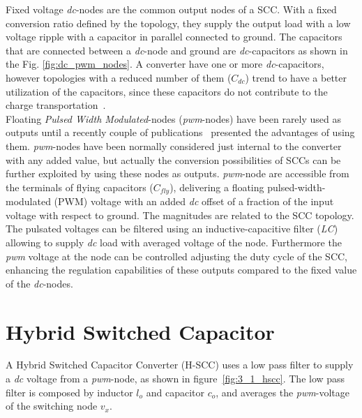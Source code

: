 Fixed voltage \emph{dc}-nodes are the common output nodes of a SCC. With a fixed conversion ratio defined by the topology, they supply the output load with a low voltage ripple with a capacitor in parallel connected to ground. The capacitors that are connected between a \emph{dc}-node and ground are  \emph{dc}-capacitors as shown in the Fig. \ref{fig:dc_pwm_nodes}. A converter have one or more \emph{dc}-capacitors, however topologies with a reduced number of them ($C_{dc}$) trend to have a better utilization of the capacitors, since these capacitors do not contribute to the charge transportation~\cite{Seeman:EECS-2009-78}.\\

Floating \emph{Pulsed Width Modulated}-nodes (\emph{pwm}-nodes) have been rarely used as outputs until a recently  couple of publications~\cite{2012Kumar, 2012Kline} presented the advantages of using them. \emph{pwm}-nodes have been normally considered just internal to the converter with any added value, but actually the conversion possibilities of SCCs can be further exploited by using these nodes as outputs.
\emph{pwm}-node are accessible from the terminals of flying capacitors ($C_{fly}$), delivering a floating pulsed-width-modulated (PWM) voltage with an added \emph{dc} offset of a fraction of the input voltage with respect to ground. The magnitudes are related to the SCC topology. The pulsated voltages can be filtered using an inductive-capacitive filter (\emph{LC}) allowing to supply \emph{dc} load with averaged voltage of the node. Furthermore the \emph{pwm} voltage at the node can be controlled adjusting the duty
cycle of the SCC, enhancing the regulation capabilities of these outputs compared to the fixed value of the \emph{dc}-nodes.





\section{Hybrid Switched Capacitor}
A Hybrid Switched Capacitor Converter (H-SCC) uses a low pass filter to supply a \emph{dc} voltage from a \emph{pwm}-node, as shown in figure~\ref{fig:3_1_hscc}. The low pass filter is composed by inductor $l_o$ and capacitor $c_o$, and averages the \emph{pwm}-voltage of the switching node $v_x$.

